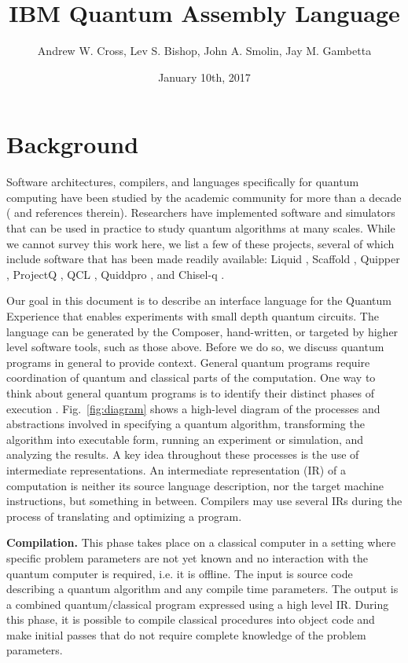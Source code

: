 \documentclass[USenglish,12pt,fleqn]{article} %
\begin{document}
\title{IBM Quantum Assembly Language}
\author{Andrew W. Cross, Lev S. Bishop, John A. Smolin, Jay M. Gambetta}
\date{January 10th, 2017}

\maketitle

\section{Background}

Software architectures, compilers, and languages specifically for quantum computing have been studied by the academic community for more than a decade (\cite{selinger04,gay06,svore06,haner16} and references therein). Researchers have implemented software and simulators that can be used in practice to study quantum algorithms at many scales. While we cannot survey this work here, we list a few of these projects, several of which include software that has been made readily available: Liquid \cite{ws14,liquid}, Scaffold \cite{scaffold,scaffcc}, Quipper \cite{valiron15,quipper,green13}, ProjectQ \cite{steiger16,projectq}, QCL \cite{omer03,qcl}, Quiddpro \cite{quiddpro,viamontes05}, and Chisel-q \cite{chiselq,chisel}.

Our goal in this document is to describe an interface language for the Quantum Experience that enables experiments with small depth quantum circuits. The language can be generated by the Composer, hand-written, or targeted by higher level software tools, such as those above. Before we do so, we discuss quantum programs in general to provide context. General quantum programs require coordination of quantum and classical parts of the computation. One way to think about general quantum programs is to identify their distinct phases of execution \cite{green13}. Fig.~\ref{fig:diagram} shows a high-level diagram of the processes and abstractions involved in specifying a quantum algorithm, transforming the algorithm into executable form, running an experiment or simulation, and analyzing the results. A key idea throughout these processes is the use of intermediate representations. An intermediate representation (IR) of a computation is neither its source language description, nor the target machine instructions, but something in between. Compilers may use several IRs during the process of translating and optimizing a program.

{\bf Compilation.} This phase takes place on a classical computer in a setting where specific problem parameters are not yet known and no interaction with the quantum computer is required, i.e. it is offline. The input is source code describing a quantum algorithm and any compile time parameters. The output is a combined quantum/classical program expressed using a high level IR. During this phase, it is possible to compile classical procedures into object code and make initial passes that do not require complete knowledge of the problem parameters.
\end{document}

